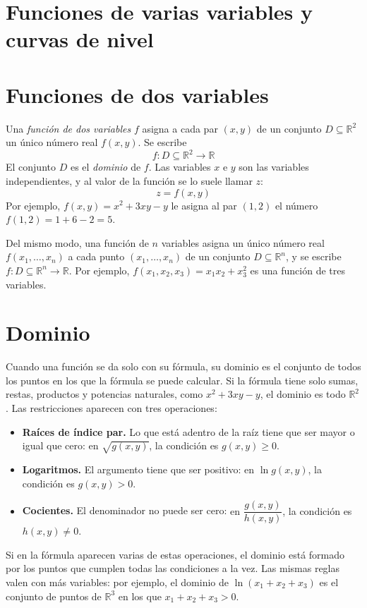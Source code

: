 \documentclass{article}
\newcommand{\R}{\ensuremath{\mathbb{R}}}
\begin{document}
\newpage

\section{Funciones de varias variables y curvas de nivel}\label{cap:curvas}

\section*{Funciones de dos variables}

{\color{teal}Una \emph{función de dos variables} \(f\) asigna a cada par \((x,y)\) de un conjunto \(D\subseteq\R^2\) un único número real \(f(x,y)\). Se escribe
\[
f\colon D\subseteq\R^2\to\R
\]
El conjunto \(D\) es el \emph{dominio} de \(f\).} Las variables \(x\) e \(y\) son las variables independientes, y al valor de la función se lo suele llamar \(z\):
\[
z=f(x,y)
\]
Por ejemplo, \(f(x,y)=x^2+3xy-y\) le asigna al par \((1,2)\) el número \(f(1,2)=1+6-2=5\).

{\color{teal}Del mismo modo, una función de \(n\) variables asigna un único número real \(f(x_1,\dots,x_n)\) a cada punto \((x_1,\dots,x_n)\) de un conjunto \(D\subseteq\R^n\), y se escribe \(f\colon D\subseteq\R^n\to\R\).} Por ejemplo, \(f(x_1,x_2,x_3)=x_1x_2+x_3^2\) es una función de tres variables.

\section*{Dominio}

{\color{teal}Cuando una función se da solo con su fórmula, su dominio es el conjunto de todos los puntos en los que la fórmula se puede calcular.} Si la fórmula tiene solo sumas, restas, productos y potencias naturales, como \(x^2+3xy-y\), el dominio es todo \(\R^2\). Las restricciones aparecen con tres operaciones:
\begin{itemize}
    \item \textbf{Raíces de índice par.} Lo que está adentro de la raíz tiene que ser mayor o igual que cero: {\color{teal}en \(\sqrt{g(x,y)}\), la condición es \(g(x,y)\geq 0\)}.
    \item \textbf{Logaritmos.} El argumento tiene que ser positivo: {\color{teal}en \(\ln g(x,y)\), la condición es \(g(x,y)>0\)}.
    \item \textbf{Cocientes.} El denominador no puede ser cero: {\color{teal}en \(\dfrac{g(x,y)}{h(x,y)}\), la condición es \(h(x,y)\neq 0\)}.
\end{itemize}
Si en la fórmula aparecen varias de estas operaciones, el dominio está formado por los puntos que cumplen todas las condiciones a la vez. Las mismas reglas valen con más variables: por ejemplo, el dominio de \(\ln(x_1+x_2+x_3)\) es el conjunto de puntos de \(\R^3\) en los que \(x_1+x_2+x_3>0\).
\end{document}
